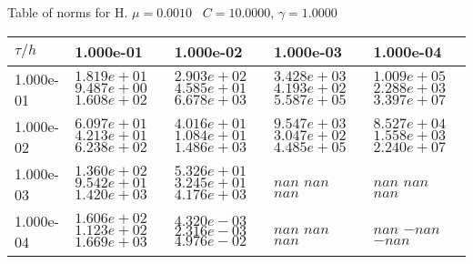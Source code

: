 \begin{center}
Table of norms for H. $\mu = 0.0010$ \, $C = 10.0000$, $\gamma = 1.0000$
  
\begin{tabular}{|p{1in}|p{1in}|p{1in}|p{1in}|p{1in}|} \hline
$\tau / h$ &1.000e-01 &1.000e-02 &1.000e-03 &1.000e-04 \\ \hline 
1.000e-01 & $1.819e+01$  $9.487e+00$  $1.608e+02$  & $2.903e+02$  $4.585e+01$  $6.678e+03$  & $3.428e+03$  $4.193e+02$  $5.587e+05$  & $1.009e+05$  $2.288e+03$  $3.397e+07$  \\ \hline 
1.000e-02 & $6.097e+01$  $4.213e+01$  $6.238e+02$  & $4.016e+01$  $1.084e+01$  $1.486e+03$  & $9.547e+03$  $3.047e+02$  $4.485e+05$  & $8.527e+04$  $1.558e+03$  $2.240e+07$  \\ \hline 
1.000e-03 & $1.360e+02$  $9.542e+01$  $1.420e+03$  & $5.326e+01$  $3.245e+01$  $4.176e+03$  & $nan$  $nan$  $nan$  & $nan$  $nan$  $nan$  \\ \hline 
1.000e-04 & $1.606e+02$  $1.123e+02$  $1.669e+03$  & $4.320e-03$  $2.316e-03$  $4.976e-02$  & $nan$  $nan$  $nan$  & $nan$  $-nan$  $-nan$  \\ \hline 

\end{tabular}\\[20pt]
\end{center}
